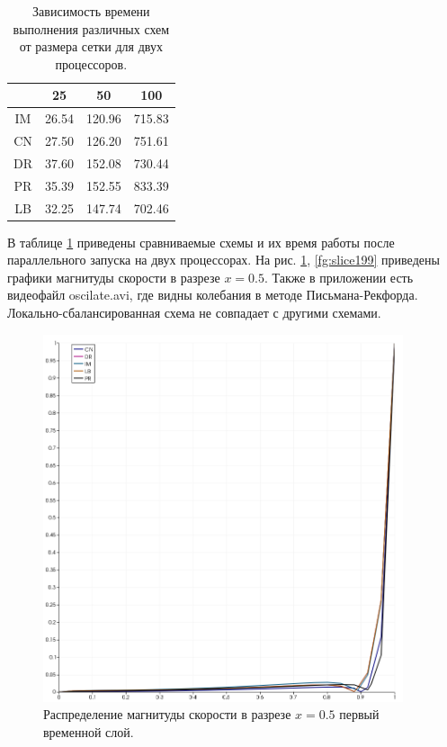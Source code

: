 \documentclass[12pt]{article}
\begin{document}
\begin{table}
    \begin{center}
	\begin{tabular}{|c|c|c|c|}
	    \hline	
	     & 25 & 50 & 100 \\
	    \hline	
	    IM & 26.54 & 120.96 & 715.83 \\
	    \hline
	    CN & 27.50 & 126.20 & 751.61 \\
	    \hline
	    DR & 37.60 & 152.08 & 730.44 \\
	    \hline
	    PR & 35.39 & 152.55 & 833.39 \\
	    \hline
	    LB & 32.25 & 147.74 & 702.46 \\
	    \hline
	\end{tabular}	
	\caption{Зависимость времени выполнения различных схем от размера сетки для двух процессоров.}
	\label{tb:time2}	 
	\end{center}
\end{table}	

В таблице \ref{tb:time2} приведены сравниваемые схемы и их время работы после параллельного запуска на двух процессорах.
На рис. \ref{fg:slice1},  \ref{fg:slice199} приведены графики магнитуды скорости в разрезе $x=0.5$. Также в приложении есть видеофайл oscilate.avi, где видны колебания в методе Письмана-Рекфорда. Локально-сбалансированная схема не совпадает с другими схемами.

\begin{figure}
	\begin{center}
		\includegraphics[width=400px]{pics/slice1}
		\caption{Распределение магнитуды скорости в разрезе $x=0.5$ первый временной слой.}
		\label{fg:slice1}
	\end{center}
\end{figure}
\end{document}
